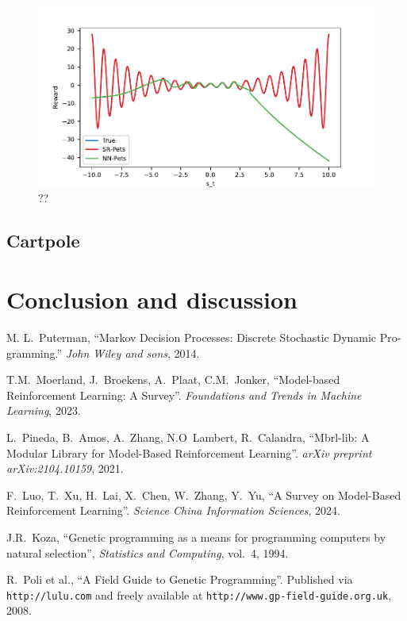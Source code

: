\documentclass[11pt]{article}
\begin{document}
\begin{figure}
	\centering
	\includegraphics{simple1dmdp_pets.pdf}
	\caption{??}
	\label{fig: simple_1dmdp}
\end{figure}

\subsection{Cartpole}


\section{Conclusion and discussion}



\begin{thebibliography}{10}
	M. L.~Puterman, ``Markov Decision Processes: Discrete Stochastic Dynamic Pro-
	gramming.'' {\em John Wiley and sons}, 2014.
	
	T.M.~Moerland, J.~Broekens, A.~Plaat, C.M.~Jonker, ``Model-based Reinforcement Learning: A Survey''. {\em Foundations and Trends in Machine Learning}, 2023.
	
	L.~Pineda, B.~Amos, A.~Zhang, N.O~Lambert, R.~Calandra, ``Mbrl-lib: A Modular Library for Model-Based Reinforcement Learning''. {\em arXiv preprint arXiv:2104.10159}, 2021.
	
	F.~Luo, T.~Xu, H.~Lai, X.~Chen, W.~Zhang, Y.~Yu, ``A Survey on Model-Based Reinforcement Learning''. {\em Science China Information Sciences}, 2024.
	
	J.R.~Koza, ``Genetic programming as a means for programming computers by natural selection'', 
	{\em Statistics and Computing}, vol.~4, 1994.
	
	R.~Poli et al., ``A Field Guide to Genetic Programming''.
	\newblock Published via \texttt{http://lulu.com} and freely available at \texttt{http://www.gp-field-guide.org.uk}, 2008.
	
\end{thebibliography}
\end{document}
